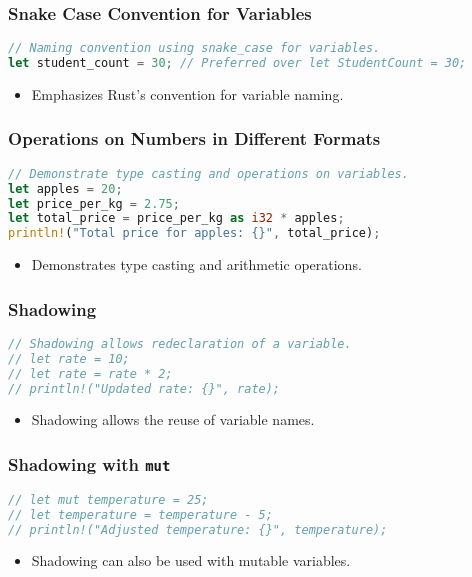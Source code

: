 \documentclass[aspectratio=169, table]{beamer}
\begin{document}
\begin{frame}[fragile]
\frametitle{Snake Case Convention for Variables}
\begin{lstlisting}[language=Rust]
// Naming convention using snake_case for variables.
let student_count = 30; // Preferred over let StudentCount = 30;
\end{lstlisting}
\begin{itemize}
\item Emphasizes Rust's convention for variable naming.
\end{itemize}
\end{frame}

\begin{frame}[fragile]
\frametitle{Operations on Numbers in Different Formats}
\begin{lstlisting}[language=Rust]
// Demonstrate type casting and operations on variables.
let apples = 20;
let price_per_kg = 2.75;
let total_price = price_per_kg as i32 * apples;
println!("Total price for apples: {}", total_price);
\end{lstlisting}
\begin{itemize}
\item Demonstrates type casting and arithmetic operations.
\end{itemize}
\end{frame}

\begin{frame}[fragile]
\frametitle{Shadowing}
\begin{lstlisting}[language=Rust]
// Shadowing allows redeclaration of a variable.
// let rate = 10;
// let rate = rate * 2;
// println!("Updated rate: {}", rate);
\end{lstlisting}
\begin{itemize}
\item Shadowing allows the reuse of variable names.
\end{itemize}
\end{frame}

\begin{frame}[fragile]
\frametitle{Shadowing with \texttt{mut}}
\begin{lstlisting}[language=Rust]
// let mut temperature = 25;
// let temperature = temperature - 5;
// println!("Adjusted temperature: {}", temperature);
\end{lstlisting}
\begin{itemize}
\item Shadowing can also be used with mutable variables.
\end{itemize}
\end{frame}
\end{document}
